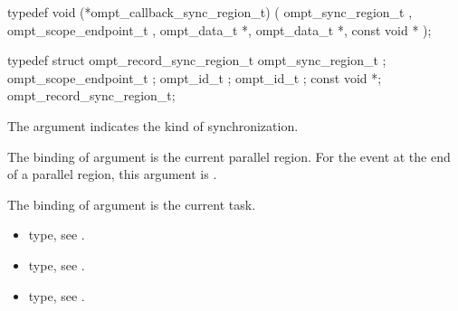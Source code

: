 \label{sec:ompt_callback_sync_region_t}
\format

\begin{ccppspecific}
\begin{omptCallback}
typedef void (*ompt_callback_sync_region_t) (
  ompt_sync_region_t ,
  ompt_scope_endpoint_t ,
  ompt_data_t *,
  ompt_data_t *,
  const void *
);
\end{omptCallback}
\end{ccppspecific}


\record

\begin{ccppspecific}
\begin{omptRecord}
typedef struct ompt_record_sync_region_t {
  ompt_sync_region_t ;
  ompt_scope_endpoint_t ;
  ompt_id_t ;
  ompt_id_t ;
  const void *;
} ompt_record_sync_region_t;
\end{omptRecord}
\end{ccppspecific}



\argdesc

The argument  indicates the kind of 
synchronization.

\epdesc

The binding of argument  is the current
parallel region.
For the  event at the end of a parallel region,
this argument is .

The binding of argument  is the current task.

\codeptrdesc

\crossreferences
\begin{itemize}
\item {} type, see
.
\item {} type, see
.
\item {} type, see
.
\end{itemize}


